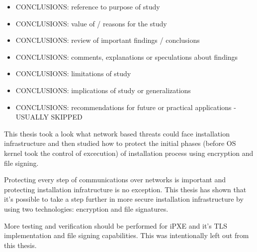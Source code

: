 
\begin{itemize}
\item CONCLUSIONS: reference to purpose of study
\item CONCLUSIONS: value of / reasons for the study
\item CONCLUSIONS: review of important findings / conclusions
\item CONCLUSIONS: comments, explanations or speculations about findings
\item CONCLUSIONS: limitations of study
\item CONCLUSIONS: implications of study or generalizations
\item CONCLUSIONS: recommendations for future or practical applications - USUALLY SKIPPED
\end{itemize}

This thesis took a look what network based threats could face
installation infrastructure and then studied how to protect the
initial phases (before OS kernel took the control of excecution) of
installation process using encryption and file signing.

Protecting every step of communications over networks is important and
protecting installation infratructure is no exception. This thesis has
shown that it's possible to take a step further in more secure
installation infrastructure by using two technologies: encryption and
file signatures.

More testing and verification should be performed for iPXE
and it's TLS implementation and file signing capabilities. This was
intentionally left out from this thesis.
